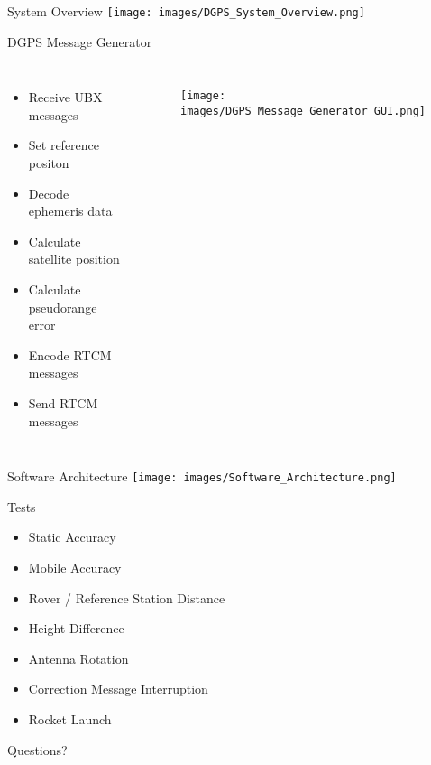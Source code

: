 \documentclass[12pt, compress, xcolor=table]{beamer}
\begin{document}
\begin{frame}{System Overview}
 \texttt{[image: images/DGPS\_System\_Overview.png]}
\end{frame}

\begin{frame}{DGPS Message Generator}
 \begin{columns}
  \begin{itemize}
   \setlength\itemsep{0.3cm}
   \item Receive UBX messages
   \item Set reference positon
   \item Decode ephemeris data
   \item Calculate satellite position
   \item Calculate pseudorange error
   \item Encode RTCM messages
   \item Send RTCM messages
  \end{itemize}
  
  \begin{figure}
   \texttt{[image: images/DGPS\_Message\_Generator\_GUI.png]}
  \end{figure}
  
 \end{columns}
\end{frame}

\begin{frame}{Software Architecture}
 \texttt{[image: images/Software\_Architecture.png]}
\end{frame}

\begin{frame}{Tests}
 \begin{itemize}
  \item Static Accuracy
  \item Mobile Accuracy
  \item Rover / Reference Station Distance
  \item Height Difference \\[15pt]
  \item Antenna Rotation
  \item Correction Message Interruption \\[15pt]
  \item Rocket Launch
 \end{itemize}
\end{frame}


\begin{frame}[standout]
 Questions?
\end{frame}
\end{document}

